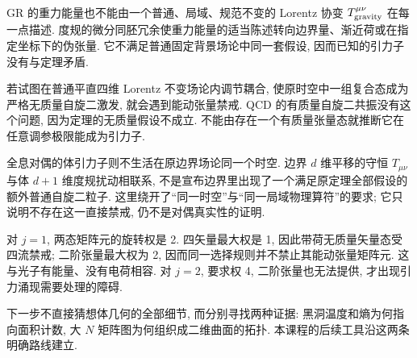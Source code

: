 GR 的重力能量也不能由一个普通、局域、规范不变的 Lorentz 协变 $T^{\mu\nu}_{\rm gravity}$ 在每一点描述. 度规的微分同胚冗余使重力能量的适当陈述转向边界量、渐近荷或在指定坐标下的伪张量. 它不满足普通固定背景场论中同一套假设, 因而已知的引力子没有与定理矛盾.

若试图在普通平直四维 Lorentz 不变场论内调节耦合, 使原时空中一组复合态成为严格无质量自旋二激发, 就会遇到能动张量禁戒. QCD 的有质量自旋二共振没有这个问题, 因为定理的无质量假设不成立. 不能由存在一个有质量张量态就推断它在任意调参极限能成为引力子.

全息对偶的体引力子则不生活在原边界场论同一个时空. 边界 $d$ 维平移的守恒 $T_{\mu\nu}$ 与体 $d+1$ 维度规扰动相联系, 不是宣布边界里出现了一个满足原定理全部假设的额外普通自旋二粒子. 这里绕开了“同一时空”与“同一局域物理算符”的要求; 它只说明不存在这一直接禁戒, 仍不是对偶真实性的证明.

\begin{example}
对 $j=1$, 两态矩阵元的旋转权是 2. 四矢量最大权是 1, 因此带荷无质量矢量态受四流禁戒; 二阶张量最大权为 2, 因而同一选择规则并不禁止其能动张量矩阵元. 这与光子有能量、没有电荷相容. 对 $j=2$, 要求权 4, 二阶张量也无法提供, 才出现引力涌现需要处理的障碍.
\end{example}
下一步不直接猜想体几何的全部细节, 而分别寻找两种证据: 黑洞温度和熵为何指向面积计数, 大 $N$ 矩阵图为何组织成二维曲面的拓扑. 本课程的后续工具沿这两条明确路线建立.
